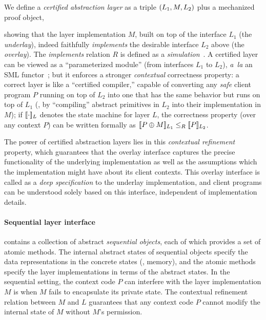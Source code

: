 We define a {\em certified abstraction
  layer} as a triple $\layer{L_1}{M}{L_2}$ plus a mechanized
proof object, 
showing that the layer
implementation $M$, built on top of the interface $L_1$ (the {\em
  underlay}), indeed faithfully {\em implements} the desirable
interface $L_2$ above (the {\em overlay}).  The {\em implements}
relation $R$ is defined as a {\em simulation}~\cite{Lynch95}.
A certified layer can be
viewed as a ``parameterized module'' (from interfaces $L_1$ to $L_2$),
{\em a~la} an SML functor~\cite{milner97};
 but it enforces a stronger {\em contextual} correctness property: a correct
layer is like a ``certified compiler,'' capable of converting any {\em
  safe} client program $P$ running on top of $L_2$ into one that has the
same behavior but runs on top of $L_1$ (\eg, by ``compiling'' abstract
primitives in $L_2$ into their implementation in $M$); if
$\sem{L}{\cdot}$ denotes the state machine for layer $L$, the
correctness property (over any context $P$) can be written formally as $\sem{L_1}{P\oplus{}M} \leq_R \sem{L_2}{P}$.

The power of certified abstraction layers lies in 
this {\em contextual refinement}
property,
which guarantees that the overlay interface captures
the precise functionality of the underlying implementation as well as
the assumptions which the implementation might have about its client
contexts.
This overlay interface is called as
a {\em deep specification} 
to the underlay implementation,
and client programs can be understood solely based on this interface, independent of implementation details.

\paragraph{Sequential layer interface}
 contains a  collection of abstract 
\emph{sequential objects}, each of which provides a
set of atomic methods.
The internal abstract states of sequential objects
specify the data representations in the concrete states
(\eg, memory),
and the atomic methods
specify the layer implementations
in terms of the abstract states.
In the sequential setting, the context code $P$ can 
 interfere with the 
layer implementation $M$ is when
$M$ fails to encapsulate its private state.
The contextual refinement relation
between $M$ and $L$ guarantees that
any context code $P$ cannot
modify the internal state of $M$ 
without $M$'s permission.

